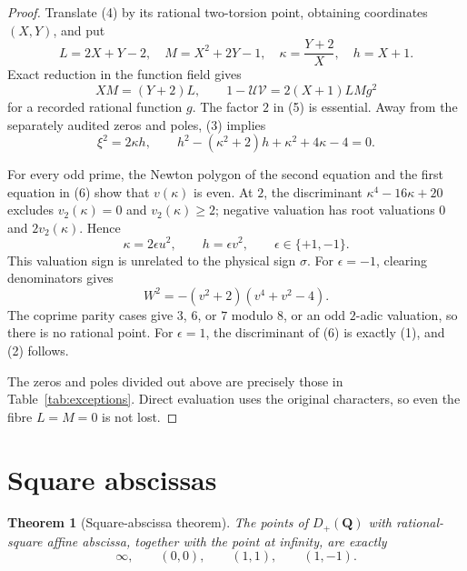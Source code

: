 \documentclass[11pt]{article}
\newtheorem{theorem}{Theorem}
\newcommand{\Q}{\mathbf Q}
\begin{document}
\begin{proof}
Translate (4) by its rational two-torsion point, obtaining coordinates
$(X,Y)$, and put
\[
L=2X+Y-2,\quad M=X^2+2Y-1,\quad
\kappa=\frac{Y+2}{X},\quad h=X+1.
\]
Exact reduction in the function field gives
\[
 XM=(Y+2)L,\qquad
 1-\mathcal U\mathcal V
 =2(X+1)LMg^2                                      \tag{5}
\]
for a recorded rational function $g$.  The factor $2$ in (5) is essential.
Away from the separately audited zeros and poles, (3) implies
\[
 \xi^2=2\kappa h,\qquad
 h^2-(\kappa^2+2)h+\kappa^2+4\kappa-4=0.           \tag{6}
\]

For every odd prime, the Newton polygon of the second equation and the first
equation in (6) show that $v(\kappa)$ is even.  At $2$, the discriminant
$\kappa^4-16\kappa+20$ excludes $v_2(\kappa)=0$ and
$v_2(\kappa)\ge2$; negative valuation has root valuations $0$ and
$2v_2(\kappa)$.  Hence
\[
 \kappa=2\epsilon u^2,\qquad h=\epsilon v^2,\qquad
 \epsilon\in\{+1,-1\}.                               \tag{7}
\]
This valuation sign is unrelated to the physical sign $\sigma$.
For $\epsilon=-1$, clearing denominators gives
\[
 W^2=-(v^2+2)(v^4+v^2-4).
\]
The coprime parity cases give $3$, $6$, or $7$ modulo $8$, or an odd
$2$-adic valuation, so there is no rational point.  For $\epsilon=1$, the
discriminant of (6) is exactly (1), and (2) follows.

The zeros and poles divided out above are precisely those in
Table~\ref{tab:exceptions}.  Direct evaluation uses the original characters,
so even the fibre $L=M=0$ is not lost.
\end{proof}

\section{Square abscissas}

\begin{theorem}[Square-abscissa theorem]\label{thm:square}
The points of $D_+(\Q)$ with rational-square affine abscissa, together with
the point at infinity, are exactly
\[
 \infty,\qquad(0,0),\qquad(1,1),\qquad(1,-1).        \tag{8}
\]
\end{theorem}
\end{document}
